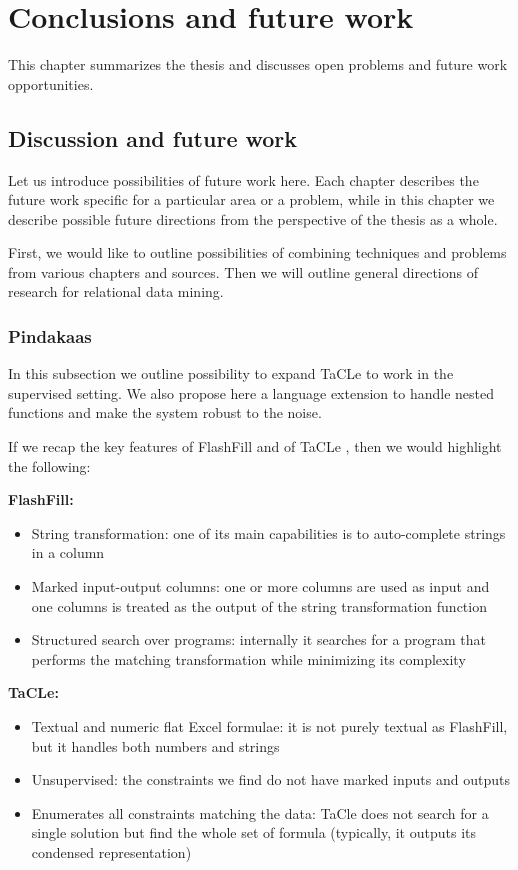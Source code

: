 \chapter{Conclusions and future work}\label{ch:conclusions}
\begin{addmargin}[2em]{2em}
This chapter summarizes the thesis and discusses open problems and
future work opportunities.
\end{addmargin}

\section{Discussion and future work}
Let us introduce possibilities of future work here. Each chapter
describes the future work specific for a particular area or a problem,
while in this chapter we describe possible future directions from the
perspective of the thesis as a whole.

First, we would like to outline possibilities of combining techniques
and problems from various chapters and sources. Then we will outline general 
directions of research for relational data mining.

\subsection{Pindakaas}
In this subsection we outline possibility to expand TaCLe to work in
the supervised setting. We also propose here a language extension to
handle nested functions and make the system robust to the noise.

If we recap the key features of FlashFill \parencite{flashfill} and of TaCLe
\parencite{tacle}, then we would highlight the following:

\textbf{FlashFill:}
\begin{itemize}
\item String transformation: one of its main capabilities is to
  auto-complete strings in a column 
\item Marked input-output columns: one or more columns are used as
  input and one columns is treated as the output of the string
  transformation function
\item Structured search over programs: internally it searches for a
  program that performs the matching transformation while minimizing
  its complexity
\end{itemize}

\textbf{TaCLe:}
\begin{itemize}
  \item Textual and numeric flat Excel formulae: it is not purely
    textual as FlashFill, but it handles both numbers and strings
  \item Unsupervised: the constraints we find do not have marked
    inputs and outputs
  \item Enumerates all constraints matching the data: TaCle does not
    search for a single solution but find the whole set of formula
    (typically, it outputs its condensed representation)
\end{itemize}


